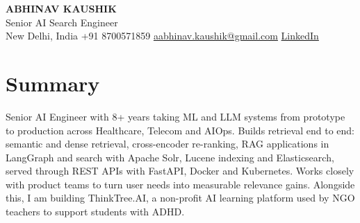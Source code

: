 \documentclass[10pt,a4paper]{article}
\begin{document}
\begin{center}
  {\LARGE\bfseries ABHINAV KAUSHIK}\\[2pt]
  {\large Senior AI Search Engineer}\\[2pt]
  New Delhi, India \textbar{} +91 8700571859 \textbar{} \href{mailto:aabhinav.kaushik@gmail.com}{aabhinav.kaushik@gmail.com} \textbar{} \href{https://www.linkedin.com/in/abhinav-kaushik10/}{LinkedIn}  
\end{center}

\section{Summary}
Senior AI Engineer with 8+ years taking ML and LLM systems from prototype to production across Healthcare, Telecom and AIOps. Builds retrieval end to end: semantic and dense retrieval, cross-encoder re-ranking, RAG applications in LangGraph and search with Apache Solr, Lucene indexing and Elasticsearch, served through REST APIs with FastAPI, Docker and Kubernetes. Works closely with product teams to turn user needs into measurable relevance gains. Alongside this, I am building ThinkTree.AI, a non-profit AI learning platform used by NGO teachers to support students with ADHD.
\end{document}
